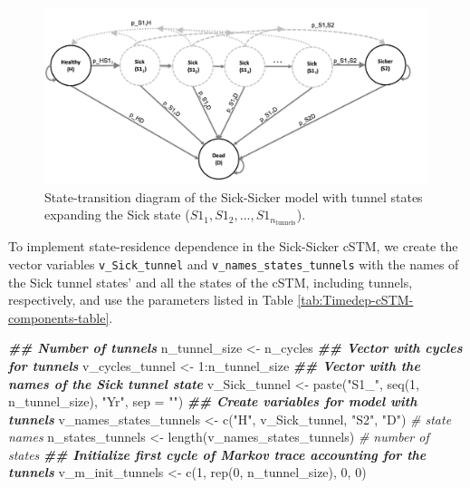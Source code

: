 \documentclass[
]{article}
\newenvironment{Shaded}{\begin{snugshade}}{\end{snugshade}}
\newcommand{\AttributeTok}[1]{\textcolor[rgb]{0.77,0.63,0.00}{#1}}
\newcommand{\CommentTok}[1]{\textcolor[rgb]{0.56,0.35,0.01}{\textit{#1}}}
\newcommand{\DecValTok}[1]{\textcolor[rgb]{0.00,0.00,0.81}{#1}}
\newcommand{\DocumentationTok}[1]{\textcolor[rgb]{0.56,0.35,0.01}{\textbf{\textit{#1}}}}
\newcommand{\FunctionTok}[1]{\textcolor[rgb]{0.00,0.00,0.00}{#1}}
\newcommand{\NormalTok}[1]{#1}
\newcommand{\OtherTok}[1]{\textcolor[rgb]{0.56,0.35,0.01}{#1}}
\newcommand{\SpecialCharTok}[1]{\textcolor[rgb]{0.00,0.00,0.00}{#1}}
\newcommand{\StringTok}[1]{\textcolor[rgb]{0.31,0.60,0.02}{#1}}
\begin{document}
\begin{figure}[H]

{\centering \includegraphics[width=1\linewidth]{figs/Sick-Sicker-with-tunnels} 

}

\caption{State-transition diagram of the Sick-Sicker model with tunnel states expanding the Sick state ($S1_1, S1_2,...,S1_{n_{\text{tunnels}}}$).}\label{fig:STD-Sick-Sicker-tunnels}
\end{figure}

To implement state-residence dependence in the Sick-Sicker cSTM, we create the vector variables \texttt{v\_Sick\_tunnel} and \texttt{v\_names\_states\_tunnels} with the names of the Sick tunnel states' and all the states of the cSTM, including tunnels, respectively, and use the parameters listed in Table \ref{tab:Timedep-cSTM-components-table}.

\begin{Shaded}
\begin{Highlighting}[]
\DocumentationTok{\#\# Number of tunnels}
\NormalTok{n\_tunnel\_size }\OtherTok{\textless{}{-}}\NormalTok{ n\_cycles }
\DocumentationTok{\#\# Vector with cycles for tunnels}
\NormalTok{v\_cycles\_tunnel }\OtherTok{\textless{}{-}} \DecValTok{1}\SpecialCharTok{:}\NormalTok{n\_tunnel\_size}
\DocumentationTok{\#\# Vector with the names of the Sick tunnel state}
\NormalTok{v\_Sick\_tunnel }\OtherTok{\textless{}{-}} \FunctionTok{paste}\NormalTok{(}\StringTok{"S1\_"}\NormalTok{, }\FunctionTok{seq}\NormalTok{(}\DecValTok{1}\NormalTok{, n\_tunnel\_size), }\StringTok{"Yr"}\NormalTok{, }\AttributeTok{sep =} \StringTok{""}\NormalTok{)}
\DocumentationTok{\#\# Create variables for model with tunnels}
\NormalTok{v\_names\_states\_tunnels }\OtherTok{\textless{}{-}} \FunctionTok{c}\NormalTok{(}\StringTok{"H"}\NormalTok{, v\_Sick\_tunnel, }\StringTok{"S2"}\NormalTok{, }\StringTok{"D"}\NormalTok{) }\CommentTok{\# state names}
\NormalTok{n\_states\_tunnels }\OtherTok{\textless{}{-}} \FunctionTok{length}\NormalTok{(v\_names\_states\_tunnels)         }\CommentTok{\# number of states}
\DocumentationTok{\#\# Initialize first cycle of Markov trace accounting for the tunnels}
\NormalTok{v\_m\_init\_tunnels }\OtherTok{\textless{}{-}} \FunctionTok{c}\NormalTok{(}\DecValTok{1}\NormalTok{, }\FunctionTok{rep}\NormalTok{(}\DecValTok{0}\NormalTok{, n\_tunnel\_size), }\DecValTok{0}\NormalTok{, }\DecValTok{0}\NormalTok{) }
\end{Highlighting}
\end{Shaded}
\end{document}
